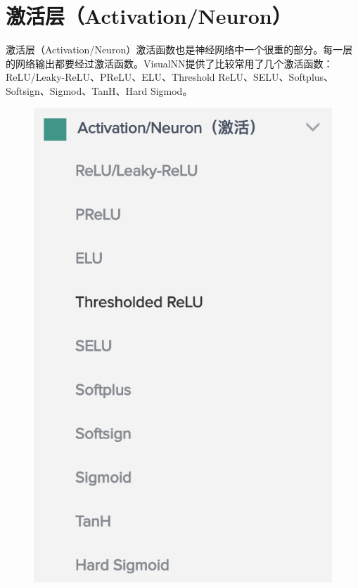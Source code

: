\documentclass{progbookcn}
\begin{document}
\section{激活层（Activation/Neuron）}

激活层（Activation/Neuron）激活函数也是神经网络中一个很重的部分。每一层的网络输出都要经过激活函数。VisualNN提供了比较常用了几个激活函数：ReLU/Leaky-ReLU、PReLU、ELU、Threshold ReLU、SELU、Softplus、Softsign、Sigmod、TanH、Hard Sigmod。
\begin{figure}[H]
  \centering
  \includegraphics[scale = 0.6]{Activation_layer.png}
\end{figure}
\end{document}
